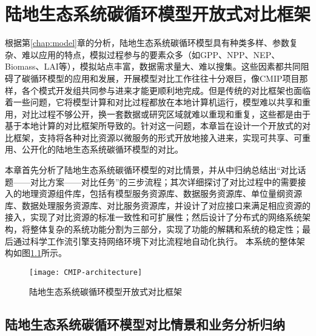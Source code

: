 \chapter{陆地生态系统碳循环模型开放式对比框架}
\label{cha:3}

根据第\ref{chap:model}章的分析，陆地生态系统碳循环模型具有种类多样、参数复杂、难以应用的特点，模拟过程参与的要素众多（如GPP、NPP、NEP、Biomass、LAI等），模拟站点丰富，数据需求量大、难以搜集。这些因素都共同阻碍了碳循环模型的应用和发展，开展模型对比工作往往十分艰巨，像CMIP项目那样，各个模式开发组共同参与进来才能更顺利地完成。但是传统的对比框架也面临着一些问题，它将模型计算和对比过程都放在本地计算机运行，模型难以共享和重用，对比过程不够公开，换一套数据或研究区域就难以重现和重复，这些都是由于基于本地计算的对比框架所导致的。针对这一问题，本章旨在设计一个开放式的对比框架，支持将各种对比资源以微服务的形式开放地接入进来，实现可共享、可重用、公开化的陆地生态系统碳循环模型的对比。

本章首先分析了陆地生态系统碳循环模型的对比情景，并从中归纳总结出“对比话题——对比方案——对比任务”的三步流程；其次详细探讨了对比过程中的需要接入的地理资源组件库，包括有模型服务资源库、数据服务资源库、单位量纲资源库、数据处理服务资源库、对比服务资源库，并设计了对应接口来满足相应资源的接入，实现了对比资源的标准一致性和可扩展性；然后设计了分布式的网络系统架构，将整体复杂的系统功能分割为三部分，实现了功能的解耦和系统的稳定性；最后通过科学工作流引擎支持网络环境下对比流程地自动化执行。
本系统的整体架构如图\ref{fig:CMIP-architecture}所示。

\begin{figure}[!htbp]
    \centering
    \texttt{[image: CMIP-architecture]}
    \caption{陆地生态系统碳循环模型开放式对比框架}
    \label{fig:CMIP-architecture}
\end{figure}

\section{陆地生态系统碳循环模型对比情景和业务分析归纳}
